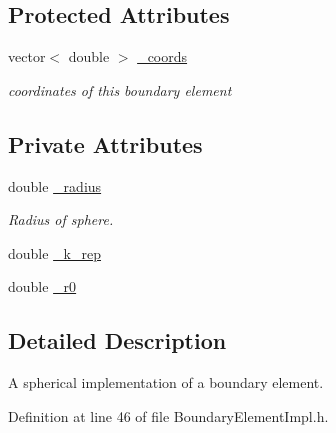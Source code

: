 \subsection*{Protected Attributes}
\begin{DoxyCompactItemize}
\item 
vector$<$ double $>$ \hyperlink{classBoundaryElement_ab51302e10e3e2def98438234ba5bf801}{\+\_\+coords}
\begin{DoxyCompactList}\small\item\em coordinates of this boundary element \end{DoxyCompactList}\end{DoxyCompactItemize}
\subsection*{Private Attributes}
\begin{DoxyCompactItemize}
\item 
double \hyperlink{classSphereBoundaryElement_a292f2562c66472f77e516ea19121f360}{\+\_\+radius}
\begin{DoxyCompactList}\small\item\em Radius of sphere. \end{DoxyCompactList}\item 
double \hyperlink{classSphereBoundaryElement_a4bca6baf26a3fb1718aaaed348646a58}{\+\_\+k\+\_\+rep}
\item 
double \hyperlink{classSphereBoundaryElement_a3e80ad9724c8ae7ff03631b4f2f84d1b}{\+\_\+r0}
\end{DoxyCompactItemize}


\subsection{Detailed Description}
A spherical implementation of a boundary element. 

Definition at line 46 of file Boundary\+Element\+Impl.\+h.



